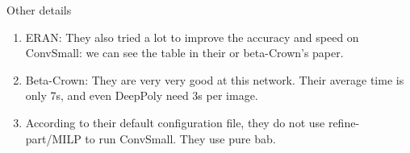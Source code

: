 \documentclass[10pt,table, UTF8]{beamer}
\theoremstyle{mydef}
\numberwithin{equation}{section}
\begin{document}
\begin{frame}{Other details}
	\begin{enumerate}
		\item ERAN: They also tried a lot to improve the accuracy and speed on ConvSmall: we can see the table in their or beta-Crown's paper.
		
		
		\vspace*{2ex}
		
		\item Beta-Crown: They are very very good at this network. Their average time is only 7s, and even DeepPoly need 3s per image.
		
		\vspace*{1ex}
		
		\item According to their default configuration file, they do not use refine-part/MILP to run ConvSmall. They use pure bab.
	\end{enumerate}
\end{frame}
\end{document}
